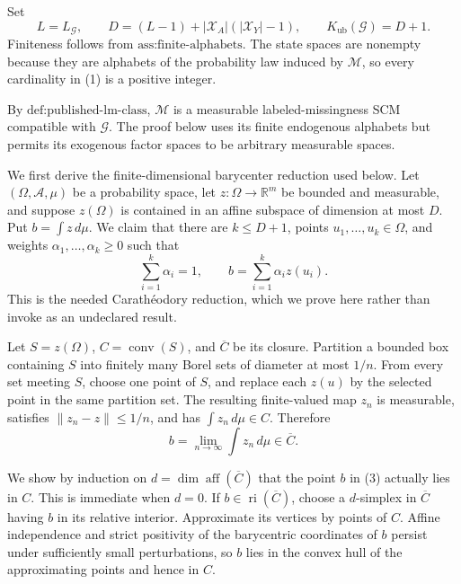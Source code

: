 Set
\[
L=L_{\mathcal G},
\qquad
D=(L-1)+|\mathcal X_A|(|\mathcal X_Y|-1),
\qquad
K_{\mathrm{ub}}(\mathcal G)=D+1.
\tag{1}
\]
Finiteness follows from \(\text{ass:finite-alphabets}\).  The state spaces are nonempty because they are alphabets of the probability law induced by \(\mathcal M\), so every cardinality in (1) is a positive integer.

By \(\text{def:published-lm-class}\), \(\mathcal M\) is a measurable labeled-missingness SCM compatible with \(\mathcal G\).  The proof below uses its finite endogenous alphabets but permits its exogenous factor spaces to be arbitrary measurable spaces.

We first derive the finite-dimensional barycenter reduction used below.  Let \((\Omega,\mathcal A,\mu)\) be a probability space, let \(z:\Omega\to\mathbb R^m\) be bounded and measurable, and suppose \(z(\Omega)\) is contained in an affine subspace of dimension at most \(D\).  Put \(b=\int z\,d\mu\).  We claim that there are \(k\leq D+1\), points \(u_1,\ldots,u_k\in\Omega\), and weights \(\alpha_1,\ldots,\alpha_k\geq0\) such that
\[
\sum_{i=1}^k\alpha_i=1,
\qquad
b=\sum_{i=1}^k\alpha_i z(u_i).
\tag{2}
\]
This is the needed Carath\'{e}odory reduction, which we prove here rather than invoke as an undeclared result.

Let \(S=z(\Omega)\), \(C=\operatorname{conv}(S)\), and \(\overline C\) be its closure.  Partition a bounded box containing \(S\) into finitely many Borel sets of diameter at most \(1/n\).  From every set meeting \(S\), choose one point of \(S\), and replace each \(z(u)\) by the selected point in the same partition set.  The resulting finite-valued map \(z_n\) is measurable, satisfies \(\|z_n-z\|\leq1/n\), and has \(\int z_n\,d\mu\in C\).  Therefore
\[
b=\lim_{n\to\infty}\int z_n\,d\mu\in\overline C.
\tag{3}
\]

We show by induction on \(d=\dim\operatorname{aff}(\overline C)\) that the point \(b\) in (3) actually lies in \(C\).  This is immediate when \(d=0\).  If \(b\in\operatorname{ri}(\overline C)\), choose a \(d\)-simplex in \(\overline C\) having \(b\) in its relative interior.  Approximate its vertices by points of \(C\).  Affine independence and strict positivity of the barycentric coordinates of \(b\) persist under sufficiently small perturbations, so \(b\) lies in the convex hull of the approximating points and hence in \(C\).

